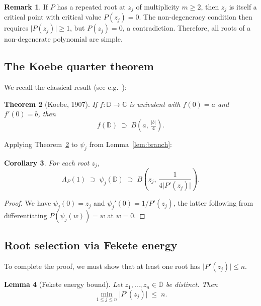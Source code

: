\documentclass[11pt,a4paper]{amsart}
\newtheorem{theorem}{Theorem}[section]
\newtheorem{lemma}[theorem]{Lemma}
\newtheorem{corollary}[theorem]{Corollary}
\theoremstyle{definition}
\newtheorem{remark}[theorem]{Remark}
\newcommand{\D}{\mathbb{D}}
\newcommand{\C}{\mathbb{C}}
\newcommand{\abs}[1]{\lvert #1 \rvert}
\begin{document}
\begin{remark}\label{rem:repeated}
If $P$ has a repeated root at $z_j$ of multiplicity $m \geq 2$, then
$z_j$ is itself a critical point with critical value $P(z_j) = 0$.
The non-degeneracy condition then requires $\abs{P(z_j)} \geq 1$,
but $P(z_j) = 0$, a contradiction.  Therefore, all roots of a
non-degenerate polynomial are simple.
\end{remark}

\subsection{The Koebe quarter theorem}

We recall the classical result (see e.g.\ \cite[Chapter~2]{Duren83}):

\begin{theorem}[Koebe, 1907]\label{thm:koebe}
If $f \colon \D \to \C$ is univalent with $f(0) = a$ and $f'(0) = b$, then
\[
  f(\D) \;\supset\; B\!\left(a,\, \tfrac{\abs{b}}{4}\right).
\]
\end{theorem}

Applying Theorem~\ref{thm:koebe} to $\psi_j$ from Lemma~\ref{lem:branch}:

\begin{corollary}\label{cor:petal-disc}
For each root $z_j$,
\[
  \Lambda_P(1) \;\supset\; \psi_j(\D) \;\supset\;
  B\!\left(z_j,\, \frac{1}{4\abs{P'(z_j)}}\right).
\]
\end{corollary}

\begin{proof}
We have $\psi_j(0) = z_j$ and $\psi_j'(0) = 1/P'(z_j)$, the latter
following from differentiating $P(\psi_j(w)) = w$ at $w = 0$.
\end{proof}

\subsection{Root selection via Fekete energy}

To complete the proof, we must show that at least one root has
$\abs{P'(z_j)} \leq n$.

\begin{lemma}[Fekete energy bound]\label{lem:fekete}
Let $z_1, \ldots, z_n \in \overline{\D}$ be distinct.  Then
\[
  \min_{1 \leq j \leq n} \abs{P'(z_j)} \;\leq\; n.
\]
\end{lemma}
\end{document}
